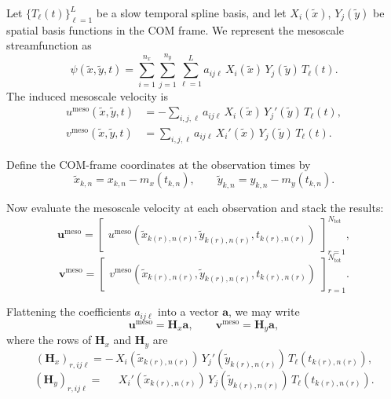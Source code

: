 \documentclass{article}
\begin{document}
Let $\{T_\ell(t)\}_{\ell=1}^{L}$ be a slow temporal spline basis, and let
$X_i(\tilde{x})$, $Y_j(\tilde{y})$ be spatial basis functions in the COM frame.
We represent the mesoscale streamfunction as
\begin{equation}
\psi(\tilde{x},\tilde{y},t)
=
\sum_{i=1}^{n_x}\sum_{j=1}^{n_y}\sum_{\ell=1}^{L}
a_{ij\ell}\,
X_i(\tilde{x})\,Y_j(\tilde{y})\,T_\ell(t).
\label{eq:psi_model}
\end{equation}
The induced mesoscale velocity is
\begin{align}
u^{\mathrm{meso}}(\tilde{x},\tilde{y},t)
&=
-\sum_{i,j,\ell}
a_{ij\ell}\,
X_i(\tilde{x})\,Y_j'(\tilde{y})\,T_\ell(t),
\label{eq:u_meso_model}
\\
v^{\mathrm{meso}}(\tilde{x},\tilde{y},t)
&=
\sum_{i,j,\ell}
a_{ij\ell}\,
X_i'(\tilde{x})\,Y_j(\tilde{y})\,T_\ell(t).
\label{eq:v_meso_model}
\end{align}

Define the COM-frame coordinates at the observation times by
\begin{equation}
\tilde{x}_{k,n}=x_{k,n}-m_x(t_{k,n}),
\qquad
\tilde{y}_{k,n}=y_{k,n}-m_y(t_{k,n}).
\label{eq:tilde_coords}
\end{equation}

Now evaluate the mesoscale velocity at each observation and stack the results:
\begin{equation}
\mathbf{u}^{\mathrm{meso}}=
\begin{bmatrix}
u^{\mathrm{meso}}(\tilde{x}_{k(r),n(r)},\tilde{y}_{k(r),n(r)},t_{k(r),n(r)})
\end{bmatrix}_{r=1}^{N_{\mathrm{tot}}},
\end{equation}
\begin{equation}
\mathbf{v}^{\mathrm{meso}}=
\begin{bmatrix}
v^{\mathrm{meso}}(\tilde{x}_{k(r),n(r)},\tilde{y}_{k(r),n(r)},t_{k(r),n(r)})
\end{bmatrix}_{r=1}^{N_{\mathrm{tot}}}.
\end{equation}

Flattening the coefficients $a_{ij\ell}$ into a vector $\mathbf{a}$, we may write
\begin{equation}
\mathbf{u}^{\mathrm{meso}}=\mathbf{H}_x \mathbf{a},
\qquad
\mathbf{v}^{\mathrm{meso}}=\mathbf{H}_y \mathbf{a},
\label{eq:Hxy_def}
\end{equation}
where the rows of $\mathbf{H}_x$ and $\mathbf{H}_y$ are
\begin{equation}
(\mathbf{H}_x)_{r,ij\ell}
=
-\,X_i(\tilde{x}_{k(r),n(r)})\,Y_j'(\tilde{y}_{k(r),n(r)})\,T_\ell(t_{k(r),n(r)}),
\end{equation}
\begin{equation}
(\mathbf{H}_y)_{r,ij\ell}
=
\phantom{-}\,X_i'(\tilde{x}_{k(r),n(r)})\,Y_j(\tilde{y}_{k(r),n(r)})\,T_\ell(t_{k(r),n(r)}).
\end{equation}
\end{document}
